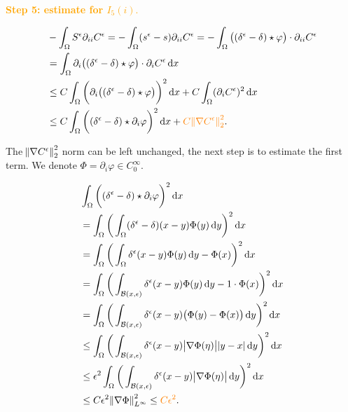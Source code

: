 \documentclass[11pt]{article}
\newcommand*\diff{\mathop{}\!\mathrm{d}}
\begin{document}
\textbf{\textcolor{orange}{Step 5: estimate for $I_5 (i).$}}

\begin{equation}
  \begin{split}
    & - \int_\Omega S^\epsilon \partial_{ii} C^\epsilon = - \int_\Omega (s^\epsilon - s) \partial_{ii} C^\epsilon  = - \int_\Omega \big ( (\delta^\epsilon - \delta ) \star \varphi \big ) \cdot \partial_{ii} C^\epsilon \\
    & = \int_\Omega \partial_i \big ( (\delta^\epsilon - \delta ) \star \varphi \big ) \cdot \partial_i C^\epsilon \diff x \\
    & \leq C \int_\Omega \bigg( \partial_i \big ( (\delta^\epsilon - \delta ) \star \varphi \big ) \bigg ) ^2 \diff x + C \int_\Omega (\partial_i C^\epsilon)^2 \diff x \\
    & \leq C \int_\Omega \bigg ( (\delta^\epsilon - \delta ) \star \partial_i \varphi \bigg ) ^2 \diff x + \textcolor{orange}{C \norm{\nabla C^\epsilon}_2^2}.
  \end{split}
\end{equation}

The $\norm{\nabla C^\epsilon}_2^2$ norm can be left unchanged, the next step is to estimate the first term. We denote $\Phi = \partial_i \varphi \in C^\infty_0.$ 

\begin{equation}
  \begin{split}
    & \int_\Omega \bigg ( (\delta^\epsilon - \delta ) \star \partial_i \varphi \bigg ) ^2 \diff x \\
    & = \int_\Omega \bigg ( \int_\Omega (\delta^\epsilon - \delta )(x-y) \Phi (y) \diff y \bigg )^2 \diff x \\
    & = \int_\Omega \bigg ( \int_\Omega \delta^\epsilon(x-y) \Phi (y) \diff y - \Phi (x) \bigg )^2 \diff x \\
    & = \int_\Omega \bigg ( \int_{\mathcal{B}(x, \epsilon)} \delta^\epsilon(x-y) \Phi (y) \diff y - 1 \cdot \Phi (x) \bigg )^2 \diff x \\
    & = \int_\Omega \bigg ( \int_{\mathcal{B}(x, \epsilon)} \delta^\epsilon(x-y) \big ( \Phi (y) - \Phi (x) \big ) \diff y \bigg )^2 \diff x \\
    & \leq \int_\Omega \bigg ( \int_{\mathcal{B}(x, \epsilon)} \delta^\epsilon(x-y) \abs{\nabla \Phi  (\eta)} \abs{y - x}  \diff y \bigg )^2 \diff x \\
    & \leq \epsilon^2 \int_\Omega \bigg ( \int_{\mathcal{B}(x, \epsilon)} \delta^\epsilon(x-y) \abs{\nabla \Phi  (\eta)} \diff y \bigg )^2 \diff x \\
    & \leq C \epsilon^2 \norm{\nabla \Phi}_{L^\infty}^2 \leq \textcolor{orange}{C \epsilon^2}.
  \end{split}
\end{equation}
\end{document}
